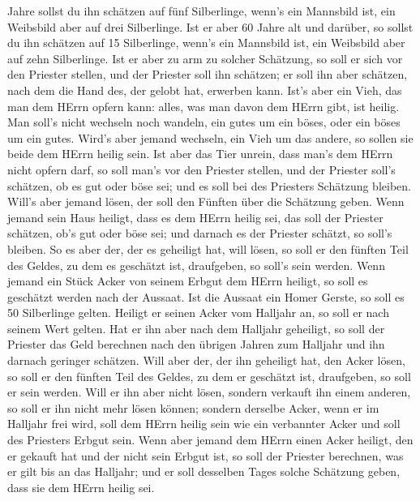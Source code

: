 Jahre sollst du ihn schätzen auf fünf Silberlinge, wenn's ein Mannsbild
ist, ein Weibsbild aber auf drei Silberlinge.  Ist er aber
60 Jahre alt und darüber, so sollst du ihn schätzen auf 15 Silberlinge,
wenn's ein Mannsbild ist, ein Weibsbild aber auf zehn Silberlinge.
 Ist er aber zu arm zu solcher Schätzung, so soll er sich
vor den Priester stellen, und der Priester soll ihn schätzen; er soll
ihn aber schätzen, nach dem die Hand des, der gelobt hat, erwerben kann.
 Ist's aber ein Vieh, das man dem HErrn opfern kann: alles,
was man davon dem HErrn gibt, ist heilig.  Man soll's nicht
wechseln noch wandeln, ein gutes um ein böses, oder ein böses um ein
gutes. Wird's aber jemand wechseln, ein Vieh um das andere, so sollen
sie beide dem HErrn heilig sein.  Ist aber das Tier unrein,
dass man's dem HErrn nicht opfern darf, so soll man's vor den Priester
stellen,  und der Priester soll's schätzen, ob es gut oder
böse sei; und es soll bei des Priesters Schätzung bleiben. 
Will's aber jemand lösen, der soll den Fünften über die Schätzung geben.
 Wenn jemand sein Haus heiligt, dass es dem HErrn heilig
sei, das soll der Priester schätzen, ob's gut oder böse sei; und darnach
es der Priester schätzt, so soll's bleiben.  So es aber
der, der es geheiligt hat, will lösen, so soll er den fünften Teil des
Geldes, zu dem es geschätzt ist, draufgeben, so soll's sein werden.
 Wenn jemand ein Stück Acker von seinem Erbgut dem HErrn
heiligt, so soll es geschätzt werden nach der Aussaat. Ist die Aussaat
ein Homer Gerste, so soll es 50 Silberlinge gelten. 
Heiligt er seinen Acker vom Halljahr an, so soll er nach seinem Wert
gelten.  Hat er ihn aber nach dem Halljahr geheiligt, so
soll der Priester das Geld berechnen nach den übrigen Jahren zum
Halljahr und ihn darnach geringer schätzen.  Will aber der,
der ihn geheiligt hat, den Acker lösen, so soll er den fünften Teil des
Geldes, zu dem er geschätzt ist, draufgeben, so soll er sein werden.
 Will er ihn aber nicht lösen, sondern verkauft ihn einem
anderen, so soll er ihn nicht mehr lösen können;  sondern
derselbe Acker, wenn er im Halljahr frei wird, soll dem HErrn heilig
sein wie ein verbannter Acker und soll des Priesters Erbgut sein.
 Wenn aber jemand dem HErrn einen Acker heiligt, den er
gekauft hat und der nicht sein Erbgut ist,  so soll der
Priester berechnen, was er gilt bis an das Halljahr; und er soll
desselben Tages solche Schätzung geben, dass sie dem HErrn heilig sei.
